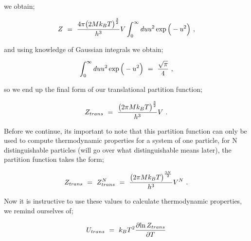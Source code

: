 \documentclass{article}
\begin{document}
we obtain;

\begin{equation} \label{eb-eq-256-87}
Z \hspace{0.125cm} = \hspace{0.125cm} \frac{ 4 \pi \big( 2 M k_B T \big)^{\frac{3}{2}}}{h^3} V \int_{0}^{\infty} d u u^2 \exp{\Big(-u^2 \Big)} \hspace{0.125cm} ,
\end{equation}

and using knowledge of Gaussian integrals we obtain;

\begin{equation} \label{eb-eq-256-88}
\int_{0}^{\infty} d u u^2 \exp{\Big(-u^2 \Big)} \hspace{0.125cm} = \hspace{0.125cm} \frac{\sqrt{\pi}}{4} \hspace{0.125cm} ,
\end{equation}

so we end up the final form of our translational partition function;

\begin{equation} \label{eb-eq-256-89}
Z_{trans} \hspace{0.125cm} = \hspace{0.125cm} \frac{\big( 2 \pi M k_B T \big)^{\frac{3}{2}}}{h^3} V \hspace{0.125cm} .
\end{equation}

Before we continue, its important to note that this partition function can only be used to compute thermodynamic properties for a system of one particle, for N distinguishable particles (will go over what distinguishable means later), the partition function takes the form;

\begin{equation} \label{eb-eq-256-90}
Z_{trans} \hspace{0.125cm} = \hspace{0.125cm} Z_{trans}^{N} \hspace{0.125cm} = \hspace{0.125cm} \frac{\big( 2 \pi M k_B T \big)^{\frac{3N}{2}}}{h^3} V^N \hspace{0.125cm} .
\end{equation}

Now it is instructive to use these values to calculate thermodynamic properties, we remind ourselves of;

\begin{equation} \label{eb-eq-256-91}
U_{trans} \hspace{0.125cm} = \hspace{0.125cm} k_B T^2 \frac{\partial{\ln{Z_{trans}}}}{\partial{T}}
\end{equation}
\end{document}
